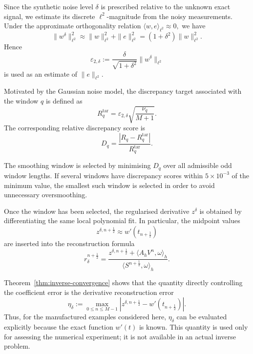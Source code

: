 \documentclass[reqno]{amsart}
\begin{document}
Since the synthetic noise level \(\delta\) is prescribed relative to
the unknown exact signal, we estimate its discrete
\(\ell^2\)-magnitude from the noisy measurements. Under the
approximate orthogonality relation
$\langle w,e\rangle_{\ell^2}\approx0,$
we have
\[
\|w^\delta\|_{\ell^2}^2
\approx
\|w\|_{\ell^2}^2+\|e\|_{\ell^2}^2
=
(1+\delta^2)\|w\|_{\ell^2}^2.
\]
Hence
\begin{equation}
\varepsilon_{2,\delta}
:=
\frac{\delta}{\sqrt{1+\delta^2}}
\|w^\delta\|_{\ell^2}
\label{eq:estimated-noise-norm}
\end{equation}
is used as an estimate of \(\|e\|_{\ell^2}\).

Motivated by the Gaussian noise model, the discrepancy target
associated with the window \(q\) is defined as
\begin{equation}
R_q^{\mathrm{tar}}
=
\varepsilon_{2,\delta}
\sqrt{
\frac{\nu_q}{M+1}
}.
\label{eq:corrected-discrepancy-target}
\end{equation}
The corresponding relative discrepancy score is
\begin{equation}
D_q
=
\frac{
|R_q-R_q^{\mathrm{tar}}|
}{
R_q^{\mathrm{tar}}
}.
\label{eq:relative-discrepancy-score}
\end{equation}

The smoothing window is selected by minimising \(D_q\) over all
admissible odd window lengths. If several windows have discrepancy
scores within \(5\times10^{-3}\) of the minimum value, the smallest
such window is selected in order to avoid unnecessary oversmoothing.

Once the window has been selected, the regularised derivative
\(z^\delta\) is obtained by differentiating the same local polynomial
fit. In particular, the midpoint values
\[
z^{\delta,n+\frac12}
\approx
w'(t_{n+\frac12})
\]
are inserted into the reconstruction formula
\begin{equation}
r_\delta^{n+\frac12}
=
\frac{
z^{\delta,n+\frac12}
+
\langle A_hV^n,\omega\rangle_h
}{
\langle S^{n+\frac12},\omega\rangle_h
}.
\label{eq:noisy-reconstruction-formula}
\end{equation}

Theorem~\ref{thm:inverse-convergence} shows that the quantity directly
controlling the coefficient error is the derivative reconstruction
error
\begin{equation}
\eta_\delta
:=
\max_{0\le n\le M-1}
\left|
z^{\delta,n+\frac12}
-
w'(t_{n+\frac12})
\right|.
\label{eq:eta-delta}
\end{equation}
Thus, for the manufactured examples considered here, $\eta_\delta$
can be evaluated explicitly because the exact function \(w'(t)\) is
known. This quantity is used only for assessing the numerical
experiment; it is not available in an actual inverse problem.
\end{document}
